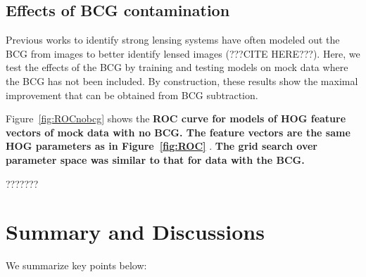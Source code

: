\documentclass{emulateapj}
\newcommand{\todo}[1]{{\bf\color{blue} #1}}
\begin{document}
\subsection{Effects of BCG contamination}

Previous works to identify strong lensing systems have often modeled
out the BCG from images to better identify lensed images (???CITE
HERE???).  Here, we test the effects of the BCG by training and
testing models on mock data where the BCG has not been included.  By
construction, these results show the maximal improvement that can be
obtained from BCG subtraction.

Figure~\ref{fig:ROCnobcg} shows the \todo{ROC curve for models of HOG
  feature vectors of mock data with no BCG.  The feature vectors are
  the same HOG parameters as in Figure~\ref{fig:ROC} }.  \todo{The
  grid search over parameter space was similar to that for data with
  the BCG.}

???????

\section{Summary and Discussions}
\label{sec:conclusions}

We summarize key points below:
\end{document}
